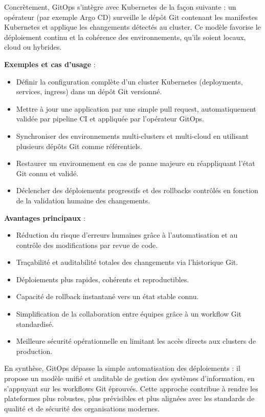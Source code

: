 Concrètement, GitOps s’intègre avec Kubernetes de la façon suivante : un opérateur (par exemple Argo CD) surveille le dépôt Git contenant les manifestes Kubernetes et applique les changements détectés au cluster. Ce modèle favorise le déploiement continu et la cohérence des environnements, qu’ils soient locaux, cloud ou hybrides.

\textbf{Exemples et cas d’usage} :
\begin{itemize}
	\item Définir la configuration complète d’un cluster Kubernetes (deployments, services, ingress) dans un dépôt Git versionné.
	\item Mettre à jour une application par une simple pull request, automatiquement validée par pipeline CI et appliquée par l’opérateur GitOps.
	\item Synchroniser des environnements multi-clusters et multi-cloud en utilisant plusieurs dépôts Git comme référentiels.
	\item Restaurer un environnement en cas de panne majeure en réappliquant l’état Git connu et validé.
	\item Déclencher des déploiements progressifs et des rollbacks contrôlés en fonction de la validation humaine des changements.
\end{itemize}

\textbf{Avantages principaux} :
\begin{itemize}
	\item Réduction du risque d’erreurs humaines grâce à l’automatisation et au contrôle des modifications par revue de code.
	\item Traçabilité et auditabilité totales des changements via l’historique Git.
	\item Déploiements plus rapides, cohérents et reproductibles.
	\item Capacité de rollback instantané vers un état stable connu.
	\item Simplification de la collaboration entre équipes grâce à un workflow Git standardisé.
	\item Meilleure sécurité opérationnelle en limitant les accès directs aux clusters de production.
\end{itemize}

En synthèse, GitOps dépasse la simple automatisation des déploiements : il propose un modèle unifié et auditable de gestion des systèmes d’information, en s’appuyant sur les workflows Git éprouvés. Cette approche contribue à rendre les plateformes plus robustes, plus prévisibles et plus alignées avec les standards de qualité et de sécurité des organisations modernes.

